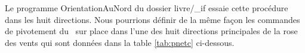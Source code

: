 {
\parindent {}
\medskip

\vspace{\neglskip}\mbox{}\par
\vspace{\neglskip}\mbox{}\par
\vspace{\neglskip}\mbox{\blc {}}\par
\vspace{\neglskip}\mbox{\blc {}}\par
\vspace{\neglskip}\mbox{\blc {}}\par
\vspace{\neglskip}\mbox{\blc {}}\par
\vspace{\neglskip}\mbox{\blc {}}\par
\vspace{\neglskip}\mbox{\blc {}}\par
\vspace{\neglskip}\mbox{\blc {}}\par

\medskip }

\noindent Le programme {\idt OrientationAuNord} du dossier {\idt livre/\_if} essaie cette
procédure dans les huit directions. Nous pourrions définir de la même façon les  commandes de pivotement du \robot\
sur place dans l'une des huit directions principales de la rose des vents qui sont données dans la table
\ref{tab:pnetc} ci-dessous.

